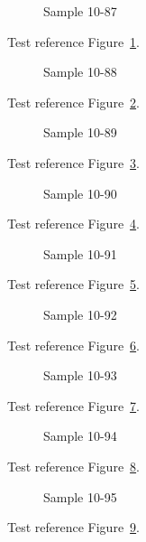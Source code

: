 \begin{figure}[tbhp]
\caption{Sample 10-87}
\label{fig:sample-10-87}
\end{figure}

Test reference Figure~\ref{fig:sample-10-87}.

\begin{figure}[tbhp]
\caption{Sample 10-88}
\label{fig:sample-10-88}
\end{figure}

Test reference Figure~\ref{fig:sample-10-88}.

\begin{figure}[tbhp]
\caption{Sample 10-89}
\label{fig:sample-10-89}
\end{figure}

Test reference Figure~\ref{fig:sample-10-89}.

\begin{figure}[tbhp]
\caption{Sample 10-90}
\label{fig:sample-10-90}
\end{figure}

Test reference Figure~\ref{fig:sample-10-90}.

\begin{figure}[tbhp]
\caption{Sample 10-91}
\label{fig:sample-10-91}
\end{figure}

Test reference Figure~\ref{fig:sample-10-91}.

\begin{figure}[tbhp]
\caption{Sample 10-92}
\label{fig:sample-10-92}
\end{figure}

Test reference Figure~\ref{fig:sample-10-92}.

\begin{figure}[tbhp]
\caption{Sample 10-93}
\label{fig:sample-10-93}
\end{figure}

Test reference Figure~\ref{fig:sample-10-93}.

\begin{figure}[tbhp]
\caption{Sample 10-94}
\label{fig:sample-10-94}
\end{figure}

Test reference Figure~\ref{fig:sample-10-94}.

\begin{figure}[tbhp]
\caption{Sample 10-95}
\label{fig:sample-10-95}
\end{figure}

Test reference Figure~\ref{fig:sample-10-95}.

